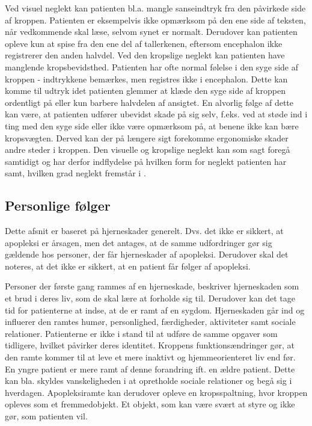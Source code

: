 Ved visuel neglekt kan patienten bl.a. mangle sanseindtryk fra den påvirkede side af kroppen. Patienten er eksempelvis ikke opmærksom på den ene side af teksten, når vedkommende skal læse, selvom synet er normalt. Derudover kan patienten opleve kun at spise fra den ene del af tallerkenen, eftersom encephalon ikke registrerer den anden halvdel. Ved den kropslige neglekt kan patienten have manglende kropsbevidsthed. Patienten har ofte normal følelse i den syge side af kroppen - indtrykkene bemærkes, men registres ikke i encephalon. Dette kan komme til udtryk idet patienten glemmer at klæde den syge side af kroppen ordentligt på eller kun barbere halvdelen af ansigtet. En alvorlig følge af dette kan være, at patienten udfører ubevidst skade på sig selv, f.eks. ved at støde ind i ting med den syge side eller ikke være opmærksom på, at benene ikke kan bære kropsvægten. Derved kan der på længere sigt forekomme ergonomiske skader andre steder i kroppen. Den visuelle og kropslige neglekt kan som sagt foregå samtidigt og har derfor indflydelse på hvilken form for neglekt patienten har samt, hvilken grad neglekt fremstår i \cite{Sundhed.dk}. 


\subsection{Personlige følger}
Dette afsnit er baseret på hjerneskader generelt. Dvs. det ikke er sikkert, at apopleksi er årsagen, men det antages, at de samme udfordringer gør sig gældende hos personer, der får hjerneskader af apopleksi. Derudover skal det noteres, at det ikke er sikkert, at en patient får følger af apopleksi.

Personer der første gang rammes af en hjerneskade, beskriver hjerneskaden som et brud i deres liv, som de skal lære at forholde sig til. Derudover kan det tage tid for patienterne at indse, at de er ramt af en sygdom. Hjerneskaden går ind og influerer den ramtes humør, personlighed, færdigheder, aktiviteter samt sociale relationer. Patienterne er ikke i stand til at udføre de samme opgaver som tidligere, hvilket påvirker deres identitet. Kroppens funktionsændringer gør, at den ramte kommer til at leve et mere inaktivt og hjemmeorienteret liv end før. En yngre patient er mere ramt af denne forandring ift. en ældre patient. Dette kan bla. skyldes vanskeligheden i at opretholde sociale relationer og begå sig i hverdagen. Apopleksiramte kan derudover opleve en kropsspaltning, hvor kroppen opleves som et fremmedobjekt. Et objekt, som kan være svært at styre og ikke gør, som patienten vil. \cite{Sundhedsstyrelsen2010}

